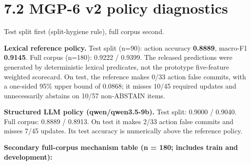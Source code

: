 \section{7.2 MGP-6 v2 policy
diagnostics}\label{mgp-6-v2-policy-diagnostics}

Test split first (split-hygiene rule), full corpus second.

\textbf{Lexical reference policy.} Test split (n=90): action accuracy
\textbf{0.8889}, macro-F1 \textbf{0.9145}. Full corpus (n=180): 0.9222 /
0.9399. The released predictions were generated by deterministic lexical
predicates, not the prototype five-feature weighted scorecard. On test,
the reference makes 0/33 action false commits, with a one-sided 95\%
upper bound of 0.0868; it misses 10/45 required updates and
unnecessarily abstains on 10/57 non-ABSTAIN items.

\textbf{Structured LLM policy (qwen/qwen3.5-9b).} Test split: 0.9000 /
0.9040. Full corpus: 0.8889 / 0.8913. On test it makes 2/33 action false
commits and misses 7/45 updates. Its test accuracy is numerically above
the reference policy.

\textbf{Secondary full-corpus mechanism table (n = 180; includes train
and development):}

